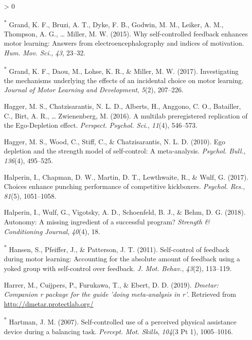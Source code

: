 \documentclass[
  english,
  man,floatsintext]{apa7}
\newlength{\cslhangindent}
\newenvironment{CSLReferences}[2] %
 {%
  \setlength{\parindent}{0pt}
  \ifodd #1 \everypar{\setlength{\hangindent}{\cslhangindent}}\ignorespaces\fi
  \ifnum #2 > 0
  \setlength{\parskip}{#2\baselineskip}
  \fi
 }%
 {}
\begin{document}
\begin{CSLReferences}{1}{0}
\leavevmode\hypertarget{ref-Grand2015-de}{}%
\textsuperscript{*} Grand, K. F., Bruzi, A. T., Dyke, F. B., Godwin, M. M., Leiker, A. M., Thompson, A. G., \ldots{} Miller, M. W. (2015). Why self-controlled feedback enhances motor learning: Answers from electroencephalography and indices of motivation. \emph{Hum. Mov. Sci.}, \emph{43}, 23--32.

\leavevmode\hypertarget{ref-Grand2017-de}{}%
\textsuperscript{*} Grand, K. F., Daou, M., Lohse, K. R., \& Miller, M. W. (2017). Investigating the mechanisms underlying the effects of an incidental choice on motor learning. \emph{Journal of Motor Learning and Development}, \emph{5}(2), 207--226.

\leavevmode\hypertarget{ref-Hagger2016-ay}{}%
Hagger, M. S., Chatzisarantis, N. L. D., Alberts, H., Anggono, C. O., Batailler, C., Birt, A. R., \ldots{} Zwienenberg, M. (2016). A multilab preregistered replication of the {Ego-Depletion} effect. \emph{Perspect. Psychol. Sci.}, \emph{11}(4), 546--573.

\leavevmode\hypertarget{ref-Hagger2010-cs}{}%
Hagger, M. S., Wood, C., Stiff, C., \& Chatzisarantis, N. L. D. (2010). Ego depletion and the strength model of self-control: A meta-analysis. \emph{Psychol. Bull.}, \emph{136}(4), 495--525.

\leavevmode\hypertarget{ref-Halperin2017-az}{}%
Halperin, I., Chapman, D. W., Martin, D. T., Lewthwaite, R., \& Wulf, G. (2017). Choices enhance punching performance of competitive kickboxers. \emph{Psychol. Res.}, \emph{81}(5), 1051--1058.

\leavevmode\hypertarget{ref-Halperin2018-rs}{}%
Halperin, I., Wulf, G., Vigotsky, A. D., Schoenfeld, B. J., \& Behm, D. G. (2018). Autonomy: A missing ingredient of a successful program? \emph{Strength \& Conditioning Journal}, \emph{40}(4), 18.

\leavevmode\hypertarget{ref-Hansen2011-rr}{}%
\textsuperscript{*} Hansen, S., Pfeiffer, J., \& Patterson, J. T. (2011). Self-control of feedback during motor learning: Accounting for the absolute amount of feedback using a yoked group with self-control over feedback. \emph{J. Mot. Behav.}, \emph{43}(2), 113--119.

\leavevmode\hypertarget{ref-R-dmetar}{}%
Harrer, M., Cuijpers, P., Furukawa, T., \& Ebert, D. D. (2019). \emph{Dmetar: Companion r package for the guide 'doing meta-analysis in r'}. Retrieved from \url{http://dmetar.protectlab.org/}

\leavevmode\hypertarget{ref-Hartman2007-uv}{}%
\textsuperscript{*} Hartman, J. M. (2007). Self-controlled use of a perceived physical assistance device during a balancing task. \emph{Percept. Mot. Skills}, \emph{104}(3 Pt 1), 1005--1016.


\end{CSLReferences}
\end{document}
